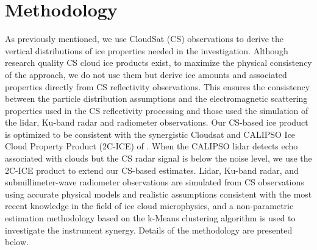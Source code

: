 \documentclass{ametsocV6.1}
\begin{document}
\section{Methodology}
As previously mentioned, we use CloudSat (CS) observations \citep{stephens2002} to derive the vertical 
distributions of ice properties needed in the investigation.  Although research quality CS cloud ice 
products exist, to maximize the physical consistency of the approach, we do not use them but derive ice amounts
and associated properties directly from CS reflectivity observations.  This ensures the consistency between 
the particle
distribution assumptions and the electromagnetic scattering properties used in the CS reflectivity processing 
and those used the simulation of the lidar, Ku-band radar and radiometer observations.  
Our CS-based ice product is optimized to be consistent with the synergistic 
Cloudsat and CALIPSO Ice Cloud Property Product (2C-ICE) of \cite{deng2015}.  When the CALIPSO lidar detects echo
associated with clouds but the CS radar signal is below the noise level, we use the 2C-ICE product to extend our 
CS-based estimates. Lidar, Ku-band radar, and submillimeter-wave radiometer observations are simulated 
from CS observations using accurate physical 
models and realistic assumptions consistent with the most recent knowledge in the field of ice cloud 
microphysics, and a non-parametric estimation methodology based on the k-Means clustering algorithm 
\cite{mackay2003information} is used to 
investigate the instrument synergy.  Details of the methodology are presented below.
\end{document}
